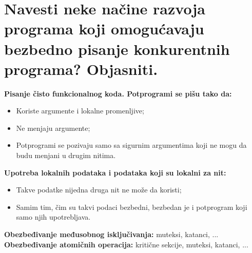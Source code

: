 \documentclass[a4paper]{article}
\begin{document}
\section{Navesti neke načine razvoja programa koji omogućavaju bezbedno 
         pisanje konkurentnih programa? Objasniti.}
  \noindent \textbf{Pisanje čisto funkcionalnog koda. Potprogrami se pišu tako da:}
  \begin{itemize}
    \item Koriste argumente i lokalne promenljive;
    \item Ne menjaju argumente;
    \item Potprogrami se pozivaju samo sa sigurnim argumentima koji ne mogu da budu menjani 
          u drugim nitima.
  \end{itemize}
  \textbf{Upotreba lokalnih podataka i podataka koji su lokalni za nit:}
  \begin{itemize}
    \item Takve podatke nijedna druga nit ne može da koristi;
    \item Samim tim, čim su takvi podaci bezbedni, bezbedan je i potprogram koji samo njih 
          upotrebljava.
  \end{itemize}
  \textbf{Obezbeđivanje međusobnog isključivanja:} muteksi, katanci, ...\\
  \textbf{Obezbeđivanje atomičnih operacija:} kritične sekcije, muteksi, katanci, ...
  
\end{document}
